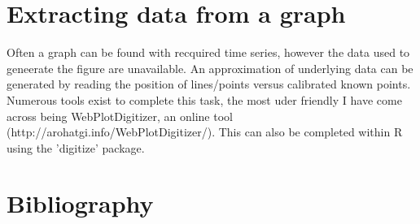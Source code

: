 \documentclass[11pt]{article}
\begin{document}
	\section{Extracting data from a graph}\label{graph}
	Often a graph can be found with recquired time series, however the data used to geneerate the figure are unavailable.
	An approximation of underlying data can be generated by reading the position of lines/points versus calibrated known points. 
	Numerous tools exist to complete this task, the most uder friendly I have come across being WebPlotDigitizer, an online tool (http://arohatgi.info/WebPlotDigitizer/). 
	This can also be completed within R using the 'digitize' package.

\newpage
\section{Bibliography}


\end{document}
